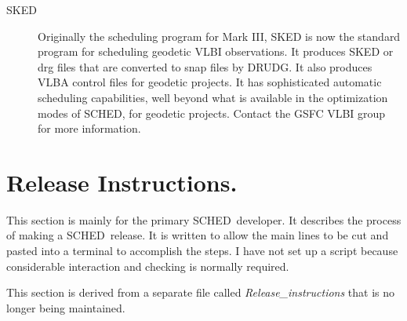 \documentclass{report}
\newcommand{\sched}{{\sc SCHED}}
\newcommand{\schedb}{{\sc SCHED~}}
\begin{document}
\begin{description}

\item [{\sc SKED}] Originally the scheduling program for Mark III,
{\sc SKED} is now the standard program for scheduling geodetic VLBI
observations.  It produces {\sc SKED} or drg files that are converted
to snap files by {\sc DRUDG}.  It also produces VLBA control files for
geodetic projects.  It has sophisticated automatic scheduling
capabilities, well beyond what is available in the optimization modes
of \sched, for geodetic projects.  Contact the GSFC VLBI group for
more information.

\end{description}


\section{\label{SEC:RELEASE}Release Instructions.}

This section is mainly for the primary \schedb developer.  It describes
the process of making a \schedb release.  It is written to allow the
main lines to be cut and pasted into a terminal to accomplish the
steps.  I have not set up a script because considerable interaction
and checking is normally required.

This section is derived from a separate file called {\sl
Release\_instructions} that is no longer being maintained.
\end{document}
